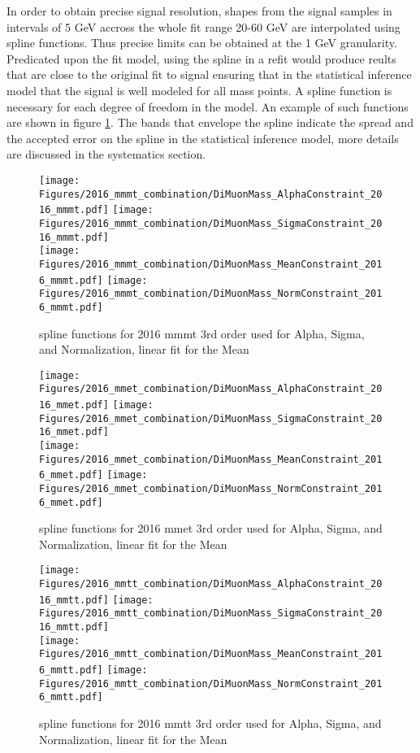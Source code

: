 In order to obtain precise signal resolution, shapes from the signal samples in intervals of 5 GeV accross the whole fit range 20-60 GeV are interpolated using spline functions. Thus precise limits can be obtained at the 1 GeV granularity. Predicated upon the fit model, using the spline in a refit would produce reults that are close to the original fit to signal ensuring that in the statistical inference model that the signal is well modeled for all mass points. A spline function is necessary for each degree of freedom in the model. An example of such functions are shown in figure \ref{fig:spline_2016_mmmt}. The bands that envelope the spline indicate the spread and the accepted error on the spline in the statistical inference model, more details are discussed in the systematics section.  
\begin{figure}[ht!b]
    \centering 
    \texttt{[image: Figures/2016\_mmmt\_combination/DiMuonMass\_AlphaConstraint\_2016\_mmmt.pdf]}
    \texttt{[image: Figures/2016\_mmmt\_combination/DiMuonMass\_SigmaConstraint\_2016\_mmmt.pdf]}\\
    \texttt{[image: Figures/2016\_mmmt\_combination/DiMuonMass\_MeanConstraint\_2016\_mmmt.pdf]}
    \texttt{[image: Figures/2016\_mmmt\_combination/DiMuonMass\_NormConstraint\_2016\_mmmt.pdf]}\\
    \caption{\label{fig:spline_2016_mmmt} spline functions for 2016 mmmt 3rd order used for Alpha, Sigma, and Normalization, linear fit for the Mean}
\end{figure}
\begin{figure}[ht!b]
    \centering 
    \texttt{[image: Figures/2016\_mmet\_combination/DiMuonMass\_AlphaConstraint\_2016\_mmet.pdf]}
    \texttt{[image: Figures/2016\_mmet\_combination/DiMuonMass\_SigmaConstraint\_2016\_mmet.pdf]}\\
    \texttt{[image: Figures/2016\_mmet\_combination/DiMuonMass\_MeanConstraint\_2016\_mmet.pdf]}
    \texttt{[image: Figures/2016\_mmet\_combination/DiMuonMass\_NormConstraint\_2016\_mmet.pdf]}\\
    \caption{\label{fig:spline_2016_mmet} spline functions for 2016 mmet 3rd order used for Alpha, Sigma, and Normalization, linear fit for the Mean}
\end{figure}
\begin{figure}[ht!b]
    \centering 
    \texttt{[image: Figures/2016\_mmtt\_combination/DiMuonMass\_AlphaConstraint\_2016\_mmtt.pdf]}
    \texttt{[image: Figures/2016\_mmtt\_combination/DiMuonMass\_SigmaConstraint\_2016\_mmtt.pdf]}\\
    \texttt{[image: Figures/2016\_mmtt\_combination/DiMuonMass\_MeanConstraint\_2016\_mmtt.pdf]}
    \texttt{[image: Figures/2016\_mmtt\_combination/DiMuonMass\_NormConstraint\_2016\_mmtt.pdf]}\\
    \caption{\label{fig:spline_2016_mmtt} spline functions for 2016 mmtt 3rd order used for Alpha, Sigma, and Normalization, linear fit for the Mean}
\end{figure}
